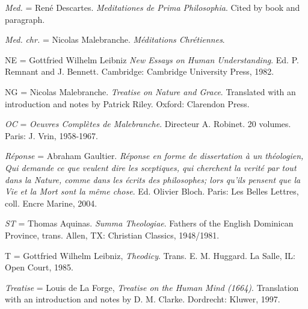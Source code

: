 \documentclass[]{article}
\begin{document}
\emph{Med.} = René Descartes. \emph{Meditationes de Prima Philosophia}.
Cited by book and paragraph.

\emph{Med.} \emph{chr.} = Nicolas Malebranche. \emph{Méditations
	Chrétiennes}.

NE = Gottfried Wilhelm Leibniz \emph{New Essays on Human Understanding}.
Ed. P. Remnant and J. Bennett. Cambridge: Cambridge University Press,
1982.

NG = Nicolas Malebranche. \emph{Treatise on Nature and Grace}.
Translated with an introduction and notes by Patrick Riley. Oxford:
Clarendon Press.

\emph{OC} = \emph{Oeuvres Complètes de Malebranche}. Directeur A.
Robinet. 20 volumes. Paris: J. Vrin, 1958-1967.

\emph{Réponse} = Abraham Gaultier. \emph{Réponse en forme de
	dissertation à un théologien, Qui demande ce que veulent dire les
	sceptiques, qui cherchent la verité par tout dans la Nature, comme dans
	les écrits des philosophes; lors qu'ils pensent que la Vie et la Mort
	sont la même chose}. Ed. Olivier Bloch. Paris: Les Belles Lettres, coll.
Encre Marine, 2004.

\emph{ST} = Thomas Aquinas. \emph{Summa Theologiae}. Fathers of the
English Dominican Province, trans. Allen, TX: Christian Classics,
1948/1981.

T = Gottfried Wilhelm Leibniz, \emph{Theodicy}. Trans. E. M. Huggard. La
Salle, IL: Open Court, 1985.

\emph{Treatise} = Louis de La Forge, \emph{Treatise on the Human Mind
	(1664)}. Translation with an introduction and notes by D. M. Clarke.
Dordrecht: Kluwer, 1997.


\printbibliography
\end{document}
